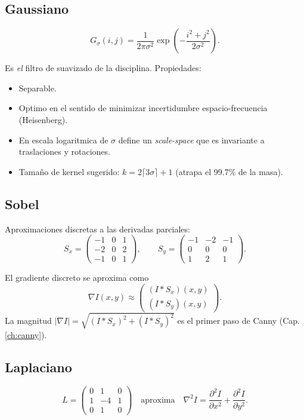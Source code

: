 \documentclass[11pt,a4paper,twoside,openright]{book}
\begin{document}
\subsection{Gaussiano}
\begin{equation}
G_\sigma(i,j) = \frac{1}{2\pi\sigma^2} \exp\!\left(-\frac{i^2+j^2}{2\sigma^2}\right).
\label{eq:gaussian}
\end{equation}

Es \emph{el} filtro de suavizado de la disciplina. Propiedades:
\begin{itemize}[leftmargin=2em]
  \item Separable.
  \item Optimo en el sentido de minimizar incertidumbre espacio-frecuencia (Heisenberg).
  \item En escala logaritmica de $\sigma$ define un \emph{scale-space} que es invariante a traslaciones y rotaciones.
  \item Tamaño de kernel sugerido: $k = 2\lceil 3\sigma\rceil + 1$ (atrapa el 99.7\% de la masa).
\end{itemize}

\subsection{Sobel}

Aproximaciones discretas a las derivadas parciales:
\begin{equation}
S_x = \begin{pmatrix} -1 & 0 & 1 \\ -2 & 0 & 2 \\ -1 & 0 & 1 \end{pmatrix}, \qquad
S_y = \begin{pmatrix} -1 & -2 & -1 \\ 0 & 0 & 0 \\ 1 & 2 & 1 \end{pmatrix}.
\end{equation}

El gradiente discreto se aproxima como
\begin{equation}
\nabla I(x,y) \approx \begin{pmatrix} (I * S_x)(x,y) \\ (I * S_y)(x,y) \end{pmatrix}.
\end{equation}
La magnitud $|\nabla I| = \sqrt{(I*S_x)^2 + (I*S_y)^2}$ es el primer paso de Canny (Cap. \ref{ch:canny}).

\subsection{Laplaciano}
\begin{equation}
L = \begin{pmatrix} 0 & 1 & 0 \\ 1 & -4 & 1 \\ 0 & 1 & 0 \end{pmatrix} \quad \text{aproxima} \quad \nabla^2 I = \frac{\partial^2 I}{\partial x^2} + \frac{\partial^2 I}{\partial y^2}.
\end{equation}
\end{document}
